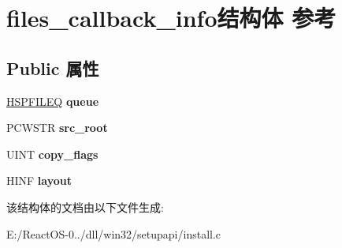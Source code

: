 \hypertarget{structfiles__callback__info}{}\section{files\+\_\+callback\+\_\+info结构体 参考}
\label{structfiles__callback__info}
\subsection*{Public 属性}
\begin{DoxyCompactItemize}
\item 
\mbox{\label{structfiles__callback__info_ae55e42210ee44239f009b1b51a711ea9}} 
\hyperlink{interfacevoid}{H\+S\+P\+F\+I\+L\+EQ} {\bfseries queue}
\item 
\mbox{\label{structfiles__callback__info_a217808065911e443a513aee51862a3b3}} 
P\+C\+W\+S\+TR {\bfseries src\+\_\+root}
\item 
\mbox{\label{structfiles__callback__info_a8a2419764a6d0c68b0537c8a5a2e2c8d}} 
U\+I\+NT {\bfseries copy\+\_\+flags}
\item 
\mbox{\label{structfiles__callback__info_a8e55b532c87913ca4d3d247e5eb2352d}} 
H\+I\+NF {\bfseries layout}
\end{DoxyCompactItemize}


该结构体的文档由以下文件生成\+:\begin{DoxyCompactItemize}
\item 
E\+:/\+React\+O\+S-\/0../dll/win32/setupapi/install.\+c\end{DoxyCompactItemize}
